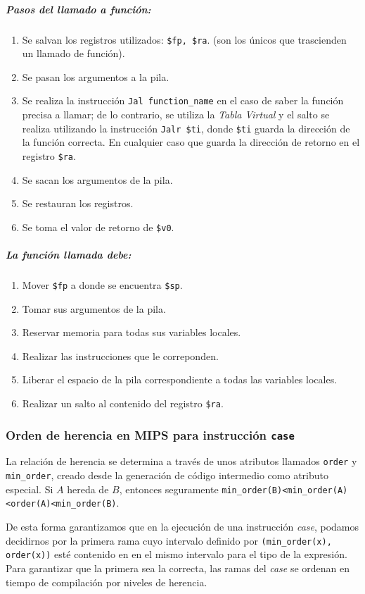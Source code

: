 \documentclass[a4paper,10pt,twocolumn]{article}
\begin{document}
\subparagraph{Pasos del llamado a función:}
		\begin{enumerate}
			\item Se salvan los registros utilizados: \lstinline|$fp, $ra|. (son los únicos que trascienden un llamado de función).
			\item Se pasan los argumentos a la pila.
			\item Se realiza la instrucción \lstinline|Jal function_name| en el caso de saber la función precisa a llamar; de lo contrario, se utiliza la \textit{Tabla Virtual} y el salto se realiza utilizando la instrucción \lstinline|Jalr $ti|, donde \lstinline|$ti| guarda la dirección de la función correcta. En cualquier caso que guarda la dirección de retorno en el registro \lstinline|$ra|.
			\item Se sacan los argumentos de la pila. 
			\item Se restauran los registros. 
			\item Se toma el valor de retorno de \lstinline|$v0|. 
		\end{enumerate}
		
\subparagraph{La función llamada debe:}
		\begin{enumerate}
			\item Mover \lstinline|$fp| a donde se encuentra \lstinline|$sp|. 
			\item Tomar sus argumentos de la pila. 
			\item Reservar memoria para todas sus variables locales. 
			\item Realizar las instrucciones que le correponden. 
			\item Liberar el espacio de la pila correspondiente a todas las variables locales. 
			\item Realizar un salto al contenido del registro \lstinline|$ra|. 
		\end{enumerate}


\subsubsection{Orden de herencia en MIPS para instrucción \lstinline|case|}
La relación de herencia se determina a través de unos atributos llamados \lstinline|order| y \lstinline|min_order|, creado desde la generación de código intermedio como atributo especial. Si $A$ hereda de $B$, entonces seguramente \lstinline|min_order(B)<min_order(A)<order(A)<min_order(B)|. 

De esta forma garantizamos que en la ejecución de una instrucción \textit{case}, podamos decidirnos por la primera rama cuyo intervalo definido por \lstinline|(min_order(x), order(x))| esté contenido en en el mismo intervalo para el tipo de la expresión. Para garantizar que la primera sea la correcta, las ramas del \textit{case} se ordenan en tiempo de compilación por niveles de herencia.  
\end{document}

